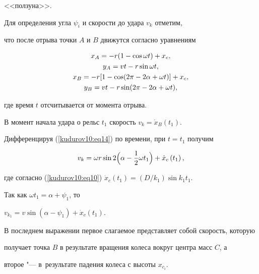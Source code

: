 <<ползуна>>.



Для определения угла $\psi_i$ и скорости до удара $v_k$ отметим,

что после отрыва точки $A$ и $B$ движутся согласно уравнениям

\begin{gather}

\label{kudurov10:eq12}

x_A =-r( 1-\cos \omega t)+x_c,\\

\label{kudurov10:eq13}

y_A =v t-r\sin \omega t,\\

\label{kudurov10:eq14}

x_B =-r [ 1-\cos ( 2\pi - 2 \alpha + \omega t) ]+x_c,\\

\notag

y_B =v t-r\sin (2\pi -2\alpha +\omega t),

\end{gather}

где время $t$ отсчитывается от момента отрыва.



В момент начала удара о рельс $t_1$ скорость  $v_k =\dot {x}_B ( t_1  )$. 

Дифференцируя (\ref{kudurov10:eq14}) по времени, при $t=t_1$ получим

$$

v_k =\omega r\sin 2\Bigl( \alpha -\frac{1}{2}\omega t_1 \Bigr)+\dot {x}_c \left( t_1  \right),

$$

где согласно (\ref{kudurov10:eq10}) $\dot {x}_c \left( t_1  \right)=({D}/{k_1})\sin k_1 t_1 $. 



Так как $\omega t_1 =\alpha +\psi_1$, то

$

v_{k_1} =v \sin \left( \alpha -\psi_1 \right) + \dot {x}_c

\left(t_1 \right).

$

В последнем выражении первое слагаемое представляет собой скорость, которую

получает точка $B$ в результате вращения колеса вокруг центра масс $C$, а

второе "--- в~результате падения колеса с высоты $x_{c_i}$.



